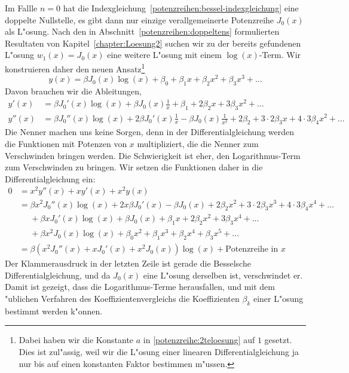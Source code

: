 Im Fallle $n=0$ hat die
Indexgleichung~\eqref{potenzreihen:bessel-indexgleichung} eine doppelte
Nullstelle, es gibt dann nur einzige verallgemeinerte Potenzreihe
$J_0(x)$ als L"osung.
Nach den in Abschnitt~\ref{potenzreihen:doppeltens} formulierten
Resultaten von Kapitel~\ref{chapter:Loesung2} suchen wir zu der bereits
gefundenen L"osung $w_1(x)=J_0(x)$ eine weitere L"osung mit einem
$\log(x)$-Term.
Wir konstruieren daher den neuen Ansatz\footnote{Dabei haben wir die
Konstante $a$ in \eqref{potenzreihe:2teloesung} auf $1$ gesetzt.
Dies ist zul"assig, weil wir die L"osung einer linearen Differentialgleichung
ja nur bis auf einen konstanten Faktor bestimmen m"ussen.}
\begin{equation}
y(x)
=
\beta J_0(x)\log(x)+\beta_0+\beta_1x+\beta_2x^2+\beta_3x^3+\dots
\label{potenzreihen:k0ansatz}
\end{equation}
Davon brauchen wir die Ableitungen, 
\begin{align*}
y'(x)
&=
\beta J_0'(x)\log(x) + \beta J_0(x)\frac1x+\beta_1+2\beta_2x+3\beta_3x^2+\dots
\\
y''(x)
&=
\beta J_0''(x)\log(x) + 2\beta J_0'(x)\frac1x-\beta J_0(x)\frac1{x^2} + 2\beta_2 + 3\cdot 2\beta_3 x + 4\cdot 3\beta_4 x^2+\dots
\end{align*}
Die Nenner machen uns keine Sorgen, denn in der Differentialgleichung werden
die Funktionen mit Potenzen von $x$ multipliziert, die die Nenner zum
Verschwinden bringen werden.
Die Schwierigkeit ist eher, den Logarithmus-Term zum Verschwinden zu bringen.
Wir setzen die Funktionen daher in die Differentialgleichung ein:
\begin{align*}
0
&=
x^2y''(x)+xy'(x)+x^2y(x)
\\
&=
\beta x^2J_0''(x)\log(x) + 2x\beta J_0'(x)-\beta J_0(x) + 2\beta_2x^2 + 3\cdot 2\beta_3 x^3 + 4\cdot 3\beta_4 x^4+\dots
\\
&\phantom{=}+
\beta xJ_0'(x)\log(x) + \beta J_0(x)+\beta_1x+2\beta_2x^2+3\beta_3x^4+\dots
\\
&\phantom{=}+
\beta x^2J_0(x)\log(x)+\beta_0x^2+\beta_1x^3 +\beta_2x^4+\beta_3x^5+\dots
\\
&=
\beta(x^2J_0''(x)+xJ_0'(x)+x^2J_0(x))\log(x)
+
\text{Potenzreihe in $x$}
\end{align*}
Der Klammerausdruck in der letzten Zeile ist gerade die Besselsche
Differentialgleichung, und da $J_0(x)$ eine L"osung derselben ist,
verschwindet er.
Damit ist gezeigt, dass die Logarithmus-Terme herausfallen, und mit dem
"ublichen Verfahren des Koeffizientenvergleichs die Koeffizienten
$\beta_k$ einer L"osung bestimmt werden k"onnen.

